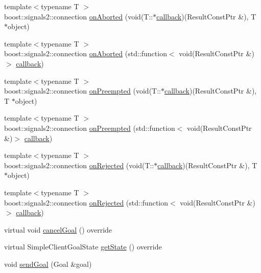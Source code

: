 \begin{DoxyCompactItemize}
\item 
{\footnotesize template$<$typename T $>$ }\\boost\+::signals2\+::connection \hyperlink{classsmacc_1_1client__bases_1_1SmaccActionClientBase_a75c58162621a705bfd11efdf068eb06b}{on\+Aborted} (void(T\+::$\ast$\hyperlink{3_2servers_2opencv__perception__node_2opencv__perception__node_8cpp_a050e697bd654facce10ea3f6549669b3}{callback})(Result\+Const\+Ptr \&), T $\ast$object)
\item 
{\footnotesize template$<$typename T $>$ }\\boost\+::signals2\+::connection \hyperlink{classsmacc_1_1client__bases_1_1SmaccActionClientBase_a67661e9415e2f2c2a1fede92a1b3dd1d}{on\+Aborted} (std\+::function$<$ void(Result\+Const\+Ptr \&)$>$ \hyperlink{3_2servers_2opencv__perception__node_2opencv__perception__node_8cpp_a050e697bd654facce10ea3f6549669b3}{callback})
\item 
{\footnotesize template$<$typename T $>$ }\\boost\+::signals2\+::connection \hyperlink{classsmacc_1_1client__bases_1_1SmaccActionClientBase_a7b11af8b2fe1cf75dead6c3a90baefe2}{on\+Preempted} (void(T\+::$\ast$\hyperlink{3_2servers_2opencv__perception__node_2opencv__perception__node_8cpp_a050e697bd654facce10ea3f6549669b3}{callback})(Result\+Const\+Ptr \&), T $\ast$object)
\item 
{\footnotesize template$<$typename T $>$ }\\boost\+::signals2\+::connection \hyperlink{classsmacc_1_1client__bases_1_1SmaccActionClientBase_a2941fe4e9a24a7862fd1cfbc63cbfcfa}{on\+Preempted} (std\+::function$<$ void(Result\+Const\+Ptr \&)$>$ \hyperlink{3_2servers_2opencv__perception__node_2opencv__perception__node_8cpp_a050e697bd654facce10ea3f6549669b3}{callback})
\item 
{\footnotesize template$<$typename T $>$ }\\boost\+::signals2\+::connection \hyperlink{classsmacc_1_1client__bases_1_1SmaccActionClientBase_a4a0f2dc95e6fbc7f25821f57e23b7905}{on\+Rejected} (void(T\+::$\ast$\hyperlink{3_2servers_2opencv__perception__node_2opencv__perception__node_8cpp_a050e697bd654facce10ea3f6549669b3}{callback})(Result\+Const\+Ptr \&), T $\ast$object)
\item 
{\footnotesize template$<$typename T $>$ }\\boost\+::signals2\+::connection \hyperlink{classsmacc_1_1client__bases_1_1SmaccActionClientBase_af6f191d1b1612d57082aa278db1f7be4}{on\+Rejected} (std\+::function$<$ void(Result\+Const\+Ptr \&)$>$ \hyperlink{3_2servers_2opencv__perception__node_2opencv__perception__node_8cpp_a050e697bd654facce10ea3f6549669b3}{callback})
\item 
virtual void \hyperlink{classsmacc_1_1client__bases_1_1SmaccActionClientBase_aedeaf9704b73bf05b5522f7250416c9a}{cancel\+Goal} () override
\item 
virtual Simple\+Client\+Goal\+State \hyperlink{classsmacc_1_1client__bases_1_1SmaccActionClientBase_a97192acd7bb7cac5de0191e700ab72ee}{get\+State} () override
\item 
void \hyperlink{classsmacc_1_1client__bases_1_1SmaccActionClientBase_a9c47a5094ac8afb01680307fe5eca922}{send\+Goal} (Goal \&goal)
\end{DoxyCompactItemize}

